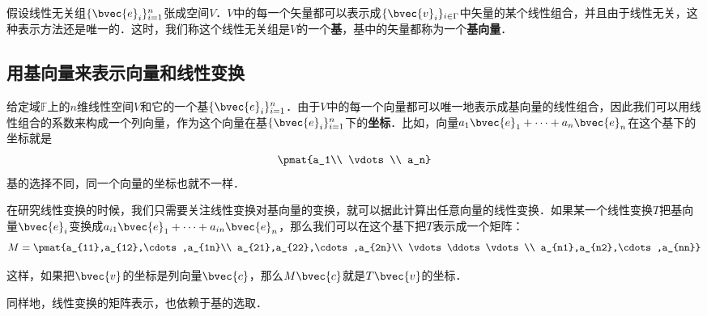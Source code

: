 假设线性无关组$\{\bvec{e}_i\}_{i=1}^{n}$张成空间$V$．$V$中的每一个矢量都可以表示成$\{\bvec{v}_i\}_{i\in\Gamma}$中矢量的某个线性组合，并且由于线性无关，这种表示方法还是唯一的．这时，我们称这个线性无关组是$V$的一个\textbf{基}，基中的矢量都称为一个\textbf{基向量}．

\subsection{用基向量来表示向量和线性变换}

给定域$\mathbb{F}$上的$n$维线性空间$V$和它的一个基$\{\bvec{e}_i\}_{i=1}^{n}$．由于$V$中的每一个向量都可以唯一地表示成基向量的线性组合，因此我们可以用线性组合的系数来构成一个列向量，作为这个向量在基$\{\bvec{e}_i\}_{i=1}^{n}$下的\textbf{坐标}．比如，向量$a_1\bvec{e}_1+\cdots+a_n\bvec{e}_n$在这个基下的坐标就是
\begin{equation}
\pmat{a_1\\ \vdots\\ a_n}
\end{equation}
基的选择不同，同一个向量的坐标也就不一样．

在研究线性变换的时候，我们只需要关注线性变换对基向量的变换，就可以据此计算出任意向量的线性变换．如果某一个线性变换$T$把基向量$\bvec{e}_i$变换成$a_{i1}\bvec{e}_1+\cdots+a_{in}\bvec{e}_n$，那么我们可以在这个基下把$T$表示成一个矩阵：
\begin{equation}
M=\pmat{a_{11},a_{12},\cdots,a_{1n}\\ a_{21},a_{22},\cdots,a_{2n}\\ \vdots\ddots\vdots\\ a_{n1},a_{n2},\cdots,a_{nn}}
\end{equation}

这样，如果把$\bvec{v}$的坐标是列向量$\bvec{c}$，那么$M\bvec{c}$就是$T\bvec{v}$的坐标．

同样地，线性变换的矩阵表示，也依赖于基的选取．